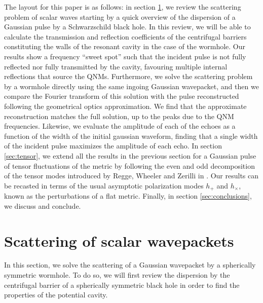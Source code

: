 \documentclass[article,aps,nofootinbib,twocolumn,superscriptaddress]{revtex4-1}
\begin{document}
The layout for this paper is as follows: in section \ref{sec:scalar}, we review the scattering problem of scalar waves starting by a quick overview of the dispersion of a Gaussian pulse by a Schwarzschild black hole. In this review, we will be able to calculate the transmission and reflection coefficients of the centrifugal barriers constituting the walls of the resonant cavity in the case of the wormhole. Our results show a frequency ``sweet spot'' such that the incident pulse is not fully reflected nor fully transmitted by the cavity, favouring multiple internal reflections that source the QNMs.  Furthermore, we solve the scattering problem by a wormhole directly using the same ingoing Gaussian wavepacket, and then we compare the Fourier transform of this solution with the pulse reconstructed following the geometrical optics approximation. We find that the approximate reconstruction matches the full solution, up to the peaks due to the QNM frequencies. Likewise, we evaluate the amplitude of each of the echoes as a function of the width of the initial gaussian waveform, finding that a single width of the incident pulse maximizes the amplitude of each echo. In section \ref{sec:tensor}, we extend all the results in the previous section for a Gaussian pulse of tensor fluctuations of the metric by following the even and odd decomposition of the tensor modes introduced by Regge, Wheeler and Zerilli in \citep{Regge:1957td, PhysRevD.2.2141, PhysRevD.5.2419, PhysRevD.5.2439}. Our results can be recasted in terms of the usual asymptotic polarization modes $h_+$ and $h_{\times}$, known as the perturbations of a flat metric. Finally, in section \ref{sec:conclusions}, we discuss and conclude.

\section{Scattering of scalar wavepackets}\label{sec:scalar}
In this section, we solve the scattering of a Gaussian wavepacket by a spherically symmetric wormhole. To do so, we will first review the dispersion by the centrifugal barrier of a spherically symmetric black hole in order to find the properties of the potential cavity.
\end{document}
